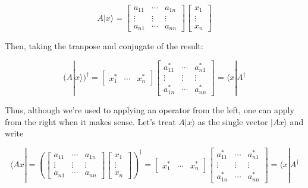 \documentclass[main.tex]{subfiles}
\begin{document}
    $$
    A|x\rangle=\left[\begin{array}{ccc}
    a_{11} & \cdots & a_{1 n} \\
    \vdots & \vdots & \vdots \\
    a_{n 1} & \cdots & a_{n n}
    \end{array}\right]\left[\begin{array}{c}
    x_{1} \\
    \vdots \\
    x_{n}
    \end{array}\right]
    $$
    
    Then, taking the tranpose and conjugate of the result:
    
    $$
    (A|x\rangle)^{\dagger}=\left[\begin{array}{ccc}
    x_{1}^{*} & \cdots & x_{n}^{*}
    \end{array}\right]\left[\begin{array}{ccc}
    a_{11}^{*} & \cdots & a_{n 1}^{*} \\
    \vdots & \vdots & \vdots \\
    a_{1 n}^{*} & \cdots & a_{n n}^{*}
    \end{array}\right]=\langle x| A^{\dagger}
    $$
    
    Thus, although we're used to applying an operator from the left, one can apply from the right when it makes sense. Let's treat $A|x\rangle$ as the single vector $|A x\rangle$ and write
    
    $$
    \langle A x|=\left(\left[\begin{array}{ccc}
    a_{11} & \cdots & a_{1 n} \\
    \vdots & \vdots & \vdots \\
    a_{n 1} & \cdots & a_{n n}
    \end{array}\right]\left[\begin{array}{c}
    x_{1} \\
    \vdots \\
    x_{n}
    \end{array}\right]\right)^{\dagger}=\left[\begin{array}{lll}
    x_{1}^{*} & \cdots & x_{n}^{*}
    \end{array}\right]\left[\begin{array}{ccc}
    a_{11}^{*} & \cdots & a_{n 1}^{*} \\
    \vdots & \vdots & \vdots \\
    a_{1 n}^{*} & \cdots & a_{n n}^{*}
    \end{array}\right]=\langle x| A^{\dagger}
    $$
    
\end{document}
